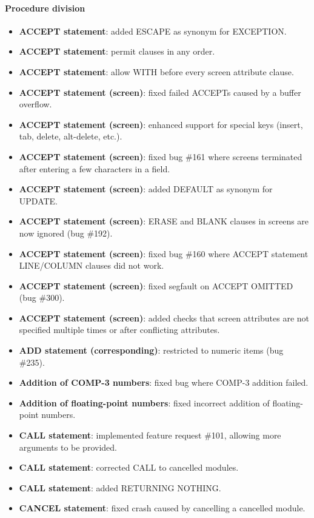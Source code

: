 \paragraph{Procedure division}
\begin{itemize}
\item \textbf{ACCEPT statement}: added ESCAPE as synonym for EXCEPTION.
\item \textbf{ACCEPT statement}: permit clauses in any order.
\item \textbf{ACCEPT statement}: allow WITH before every screen attribute clause.
\item \textbf{ACCEPT statement (screen)}: fixed failed ACCEPTs caused by a buffer overflow.
\item \textbf{ACCEPT statement (screen)}: enhanced support for special keys (insert, tab, delete, alt-delete, etc.).
\item \textbf{ACCEPT statement (screen)}: fixed bug \#161 where screens terminated after entering a few characters in a field.
\item \textbf{ACCEPT statement (screen)}: added DEFAULT as synonym for UPDATE.
\item \textbf{ACCEPT statement (screen)}: ERASE and BLANK clauses in screens are now ignored (bug \#192).
\item \textbf{ACCEPT statement (screen)}: fixed bug \#160 where ACCEPT statement LINE\slash{}COLUMN clauses did not work.
\item \textbf{ACCEPT statement (screen)}: fixed segfault on ACCEPT OMITTED (bug \#300).
\item \textbf{ACCEPT statement (screen)}: added checks that screen attributes are not specified multiple times or after conflicting attributes.
\item \textbf{ADD statement (corresponding)}: restricted to numeric items (bug \#235).
\item \textbf{Addition of COMP-3 numbers}: fixed bug where COMP-3 addition failed.
\item \textbf{Addition of floating-point numbers}: fixed incorrect addition of floating-point numbers.
\item \textbf{CALL statement}: implemented feature request \#101, allowing more arguments to be provided.
\item \textbf{CALL statement}: corrected CALL to cancelled modules.
\item \textbf{CALL statement}: added RETURNING NOTHING.
\item \textbf{CANCEL statement}: fixed crash caused by cancelling a cancelled module.

\end{itemize}
